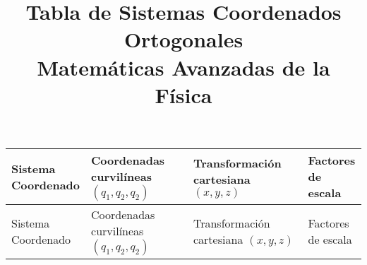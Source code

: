 \documentclass[12pt,landscape]{article}
\title{Tabla de Sistemas Coordenados Ortogonales \\ {\large Matemáticas Avanzadas de la Física}}
\date{ }
\numberwithin{equation}{section}
\begin{document}
\renewcommand\labelenumii{\theenumi.{\arabic{enumii}}}
\maketitle
\fontsize{14}{14}\selectfont
\vspace{-2cm}
{\renewcommand{\arraystretch}{4}%
\begin{longtable}{| l | p{5cm} | l | p{7.3cm} |}
\hline

\makecell{Sistema \\ Coordenado} & \makecell{Coordenadas \\ curvilíneas \\ $(q_{1}, q_{2}, q_{2})$} & \makecell{Transformación cartesiana \\ $(x, y,z)$} & \makecell{Factores \\ de escala} \\ \hline
\endfirsthead

\hline
\makecell{Sistema \\ Coordenado} & \makecell{Coordenadas \\ curvilíneas \\ $(q_{1}, q_{2}, q_{2})$} & \makecell{Transformación cartesiana \\ $(x, y,z)$} & \makecell{Factores \\ de escala} \\ \hline
\endhead


\end{longtable}}
\end{document}
